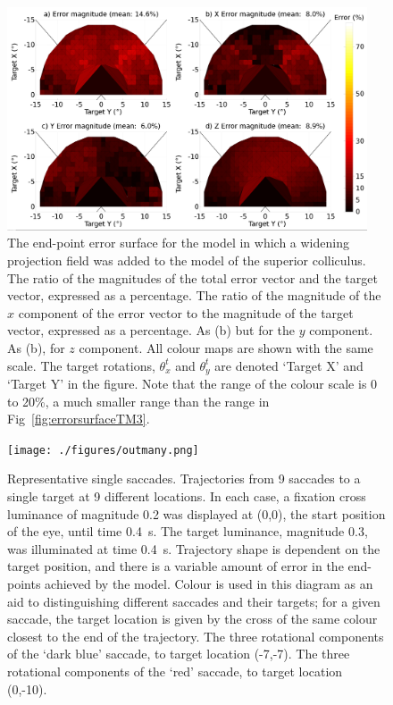 \documentclass{frontiersSCNS}
\begin{document}
\begin{figure}[!ht]
\begin{center}
\includegraphics[width=0.95\textwidth]{./figures/errorsurface.png}
\end{center}
\caption{ The end-point error surface for the model in which a widening
projection field was added to the model of the superior colliculus. 
The ratio of the magnitudes of the total error vector and the target
vector, expressed as a percentage.  The ratio of the magnitude of
the $x$ component of the error vector to the magnitude of the target
vector, expressed as a percentage.  As (b) but for the $y$
component.  As (b), for $z$ component. All colour maps are shown
with the same scale. The target rotations, $\theta_{x}^t$ and
$\theta_{y}^t$ are denoted `Target X' and `Target Y' in the figure.
Note that the range of the colour scale is 0 to 20\%, a much smaller
range than the range in Fig~\ref{fig:errorsurfaceTM3}.}
\label{fig:errorsurface}
\end{figure}

\begin{figure}[!ht]
\begin{center}
\texttt{[image: ./figures/outmany.png]}
\end{center}
\caption{ Representative single saccades.  Trajectories from 9 saccades to a
single target at 9 different locations. In each case, a fixation cross
luminance of magnitude 0.2 was displayed at (0,0), the start position
of the eye, until time 0.4~s. The target luminance, magnitude 0.3, was
illuminated at time 0.4~s. Trajectory shape is dependent on the target
position, and there is a variable amount of error in the end-points
achieved by the model. Colour is used in this diagram as an aid to
distinguishing different saccades and their targets; for a given
saccade, the target location is given by the cross of the same colour
closest to the end of the trajectory.  The three rotational
components of the `dark blue' saccade, to target location (-7,-7).  The
three rotational components of the `red' saccade, to target location
(0,-10).}
\label{fig:outmany}
\end{figure}
\end{document}
